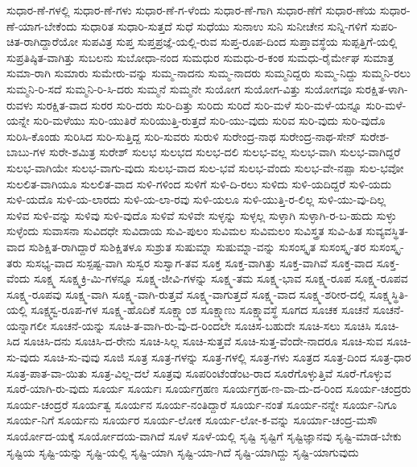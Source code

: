 {ಸುಧಾರ-ಣೆ-ಗಳಲ್ಲಿ
ಸುಧಾರ-ಣೆ-ಗಳು
ಸುಧಾರ-ಣೆ-ಗ-ಳೆಂದು
ಸುಧಾರ-ಣೆ-ಗಾಗಿ
ಸುಧಾರ-ಣೆಗೆ
ಸುಧಾರ-ಣೆಯ
ಸುಧಾರ-ಣೆ-ಯಾಗ-ಬೇಕೆಂದು
ಸುಧಾರಿತ
ಸುಧಾರಿ-ಸುತ್ತದೆ
ಸುಧೆ
ಸುಧೆಯು
ಸುನಾಉ
ಸುನಿ
ಸುನೀಚೇನ
ಸುನ್ನಿ-ಗಳಿಗೆ
ಸುಪರಿ-ಚಿತ-ರಾಗಿದ್ದಾರೆಯೋ
ಸುಪವಿತ್ರ
ಸುಪ್ತ
ಸುಪ್ತಪ್ರಜ್ಞೆ-ಯಲ್ಲಿ-ರುವ
ಸುಪ್ತ-ರೂಪ-ದಿಂದ
ಸುಪ್ತಾವಸ್ಥೆಯ
ಸುಪ್ಪತ್ತಿಗೆ-ಯಲ್ಲಿ
ಸುಪ್ರತಿಷ್ಠಿತ-ವಾಗಿತ್ತು
ಸುಬಲನು
ಸುಬೋಧಾ-ನಂದ
ಸುಮಧುರ
ಸುಮಧು-ರ-ಕಂಠ
ಸುಮಧು-ರೈರ್ಮೇಘ
ಸುಮಾತ್ರ
ಸುಮಾ-ರಾಗಿ
ಸುಮಾರು
ಸುಮೇರು-ವನ್ನು
ಸುಮ್ಮ-ನಾದನು
ಸುಮ್ಮ-ನಾದರು
ಸುಮ್ಮನಿದ್ದರು
ಸುಮ್ಮ-ನಿದ್ದು
ಸುಮ್ಮನಿ-ರಲು
ಸುಮ್ಮನಿ-ರಿ-ಸದೆ
ಸುಮ್ಮನಿ-ರಿ-ಸಿ-ದರು
ಸುಮ್ಮನೆ
ಸುಮ್ಮನೇ
ಸುಯೋಗ
ಸುಯೋಗ-ವಿತ್ತು
ಸುಯೋಗವೂ
ಸುರಕ್ಷಿತ-ಳಾಗಿ-ರುವಳು
ಸುರಕ್ಷಿತ-ವಾದ
ಸುರರ
ಸುರಿ-ದರು
ಸುರಿ-ದಿತ್ತು
ಸುರಿದು
ಸುರಿದೆ
ಸುರಿ-ಮಳೆ
ಸುರಿ-ಮಳೆ-ಯನ್ನೂ
ಸುರಿ-ಮಳೆ-ಯನ್ನೇ
ಸುರಿ-ಮಳೆಯು
ಸುರಿ-ಯುತಿರೆ
ಸುರಿಯುತ್ತಿ-ರುತ್ತದೆ
ಸುರಿ-ಯು-ವುದು
ಸುರಿವ
ಸುರಿ-ವುದು
ಸುರಿ-ವುದೊ
ಸುರಿಸಿ-ಕೊಂಡು
ಸುರಿಸಿದ
ಸುರಿ-ಸುತ್ತಿದ್ದ
ಸುರಿ-ಸುವರು
ಸುರುಳಿ
ಸುರೇಂದ್ರ-ನಾಥ
ಸುರೇಂದ್ರ-ನಾಥ-ಸೇನ್
ಸುರೇಶ-ಬಾಬು-ಗಳ
ಸುರೇ-ಶಮಿತ್ರ
ಸುರೇಶ್
ಸುಲಭ
ಸುಲಭದ
ಸುಲಭ-ದಲಿ
ಸುಲಭ-ವಲ್ಲ
ಸುಲಭ-ವಾಗಿ
ಸುಲಭ-ವಾಗಿದ್ದರೆ
ಸುಲಭ-ವಾಗಿಯೇ
ಸುಲಭ-ವಾಗು-ವುದು
ಸುಲಭ-ವಾದ
ಸುಲ-ಭವೆ
ಸುಲಭ-ವೆಂದು
ಸುಲಭ-ವೇ-ನಪ್ಪಾ
ಸುಲ-ಭವೋ
ಸುಲಲಿತ-ವಾಗಿಯೂ
ಸುಲಲಿತ-ವಾದ
ಸುಳಿ-ಗಳಿಂದ
ಸುಳಿಗೆ
ಸುಳಿ-ದಿ-ರಲು
ಸುಳಿದು
ಸುಳಿ-ಯದಿದ್ದರೆ
ಸುಳಿ-ಯದು
ಸುಳಿ-ಯದೊ
ಸುಳಿ-ಯ-ಲಾರದು
ಸುಳಿ-ಯ-ಲಾ-ರವು
ಸುಳಿ-ಯಲೂ
ಸುಳಿ-ಯುತ್ತಿ-ರ-ಲಿಲ್ಲ
ಸುಳಿ-ಯು-ವು-ದಿಲ್ಲ
ಸುಳಿವ
ಸುಳಿ-ವನ್ನು
ಸುಳಿವು
ಸುಳಿ-ವುದೊ
ಸುಳಿವೆ
ಸುಳಿವೇ
ಸುಳ್ಳನ್ನು
ಸುಳ್ಳಲ್ಲ
ಸುಳ್ಳಾಗಿ
ಸುಳ್ಳಾಗಿ-ರ-ಬ-ಹುದು
ಸುಳ್ಳು
ಸುಳ್ಳೆಂದು
ಸುವಾಸನಾ
ಸುವಿದಧೇ
ಸುವಿದಾಯ
ಸುವಿ-ಪುಲಂ
ಸುವಿಮಲ
ಸುವಿಮಲಂ
ಸುವಿಸ್ತ್ರತ
ಸುವಿ-ಹಿತ
ಸುವ್ಯವಸ್ಥಿತ-ವಾದ
ಸುಶಿಕ್ಷಿತ-ರಾಗಿದ್ದಾರೆ
ಸುಶಿಕ್ಷಿತಳೂ
ಸುಶ್ರುತ
ಸುಷುಮ್ನಾ
ಸುಷುಮ್ನಾ-ವನ್ನು
ಸುಸಂಸ್ಕೃತ
ಸುಸಂಸ್ಕೃ-ತರ
ಸುಸಂಸ್ಕೃ-ತರು
ಸುಸಭ್ಯ-ವಾದ
ಸುಸ್ಪಷ್ಟ-ವಾಗಿ
ಸುಸ್ವರ
ಸುಸ್ವಾಗ-ತವ
ಸೂಕ್ತ
ಸೂಕ್ತ-ವಾಗಿತ್ತು
ಸೂಕ್ತ-ವಾಗಿವೆ
ಸೂಕ್ತ-ವಾದ
ಸೂಕ್ತ-ವೆಂದು
ಸೂಕ್ಷ್ಮ
ಸೂಕ್ಷ್ಮಕ್ರಿ-ಮಿ-ಗಳನ್ನೂ
ಸೂಕ್ಷ್ಮ-ಜೀವಿ-ಗಳನ್ನು
ಸೂಕ್ಷ್ಮ-ತಮ
ಸೂಕ್ಷ್ಮ-ಭಾವ
ಸೂಕ್ಷ್ಮ-ರೂಪ
ಸೂಕ್ಷ್ಮ-ರೂಪವ
ಸೂಕ್ಷ್ಮ-ರೂಪವು
ಸೂಕ್ಷ್ಮ-ವಾಗಿ
ಸೂಕ್ಷ್ಮ-ವಾಗಿ-ರುತ್ತವೆ
ಸೂಕ್ಷ್ಮ-ವಾಗುತ್ತದೆ
ಸೂಕ್ಷ್ಮ-ವಾದ
ಸೂಕ್ಷ್ಮ-ಶರೀರ-ದಲ್ಲಿ
ಸೂಕ್ಷ್ಮಸ್ಥಿತಿ-ಯಲ್ಲಿ
ಸೂಕ್ಷ್ಮಸ್ವ-ರೂಪ-ಗಳ
ಸೂಕ್ಷ್ಮ-ಹೊದಿಕೆ
ಸೂಕ್ಷ್ಮಾಂಶ
ಸೂಕ್ಷ್ಮಾಣು
ಸೂಕ್ಷ್ಮಾವಸ್ಥೆ
ಸೂಗದ
ಸೂಚಕ
ಸೂಚನೆ
ಸೂಚನೆ-ಯನ್ನಾಗಲೀ
ಸೂಚನೆ-ಯನ್ನು
ಸೂಚಿ-ತ-ವಾಗಿ-ರು-ವು-ದ-ರಿಂದಲೇ
ಸೂಚಿಸ-ಬಹುದೇ
ಸೂಚಿ-ಸಲು
ಸೂಚಿಸಿ
ಸೂಚಿ-ಸಿದ
ಸೂಚಿಸಿ-ದನು
ಸೂಚಿಸಿ-ದ-ರೇನು
ಸೂಚಿ-ಸಿಲ್ಲ
ಸೂಚಿ-ಸುತ್ತವೆ
ಸೂಚಿ-ಸುತ್ತ-ವೆಂದೇ-ನಾದರೂ
ಸೂಚಿ-ಸುವ
ಸೂಚಿ-ಸು-ವುದು
ಸೂಚಿ-ಸು-ವುವು
ಸೂಜಿ
ಸೂತ್ರ
ಸೂತ್ರ-ಗಳನ್ನು
ಸೂತ್ರ-ಗಳಲ್ಲಿ
ಸೂತ್ರ-ಗಳು
ಸೂತ್ರದ
ಸೂತ್ರ-ದಿಂದ
ಸೂತ್ರ-ಧಾರ
ಸೂತ್ರ-ಪಾತ-ವಾ-ಯಿತು
ಸೂತ್ರ-ವಿಲ್ಲ-ದಲೆ
ಸೂತ್ರವು
ಸೂಪರಿಂಟೆಂಡೆಂಟ-ರಾದ
ಸೂರೆಗೊಳ್ಳುತ್ತಿವೆ
ಸೂರೆ-ಗೊಳ್ಳುವ
ಸೂರೆ-ಯಾಗಿ-ರು-ವುದು
ಸೂರ್ಯ
ಸೂರ್ಯಃ
ಸೂರ್ಯಗ್ರಹಣ
ಸೂರ್ಯಗ್ರಹ-ಣ-ವಾ-ದು-ದ-ರಿಂದ
ಸೂರ್ಯ-ಚಂದ್ರರು
ಸೂರ್ಯ-ಚಂದ್ರರೆ
ಸೂರ್ಯತ್ವ
ಸೂರ್ಯನ
ಸೂರ್ಯ-ನಂತಿದ್ದಾರೆ
ಸೂರ್ಯ-ನಂತೆ
ಸೂರ್ಯ-ನನ್ನೇ
ಸೂರ್ಯ-ನಿಗೂ
ಸೂರ್ಯ-ನಿಗೆ
ಸೂರ್ಯನು
ಸೂರ್ಯರ
ಸೂರ್ಯ-ಲೋಕ
ಸೂರ್ಯ-ಲೋ-ಕ-ವನ್ನು
ಸೂರ್ಯಾ-ಚಂದ್ರ-ಮಸೌ
ಸೂರ್ಯೋದ-ಯಕ್ಕೆ
ಸೂರ್ಯೋದಯ-ವಾಗಿದೆ
ಸೂಳೆ
ಸೂಳೆ-ಯಲ್ಲಿ
ಸೃಷ್ಟಿ
ಸೃಷ್ಟಿಗೆ
ಸೃಷ್ಟಿಜ್ಞಾನವು
ಸೃಷ್ಟಿ-ಮಾಡ-ಬೇಕು
ಸೃಷ್ಟಿಯ
ಸೃಷ್ಟಿ-ಯನ್ನು
ಸೃಷ್ಟಿ-ಯಲ್ಲಿ
ಸೃಷ್ಟಿ-ಯಾಗಿ
ಸೃಷ್ಟಿ-ಯಾ-ಗಿದೆ
ಸೃಷ್ಟಿ-ಯಾಗಿದ್ದು
ಸೃಷ್ಟಿ-ಯಾಗುವುದು
}
